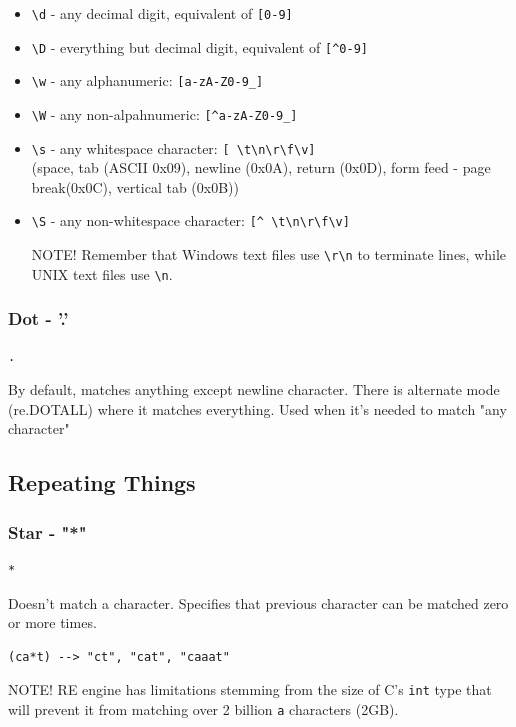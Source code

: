 \documentclass{beamer}
\begin{document}
\begin{frame}[fragile]
\begin{itemize}
\item \verb/\d/ - any decimal digit, equivalent of \verb/[0-9]/
\item \verb/\D/ - everything but decimal digit, equivalent of \verb/[^0-9]/
\pause
\item \verb/\w/ - any alphanumeric: \verb/[a-zA-Z0-9_]/
\item \verb/\W/ - any non-alpahnumeric: \verb/[^a-zA-Z0-9_]/
\pause
\item \verb/\s/ - any whitespace character: \verb/[ \t\n\r\f\v]/ \\ (space, tab (ASCII 0x09), newline (0x0A), return (0x0D), form feed - page break(0x0C), vertical tab (0x0B))
\item \verb/\S/ - any non-whitespace character: \verb/[^ \t\n\r\f\v]/

NOTE! Remember that Windows text files use \verb/\r\n/ to terminate lines, while UNIX text files use \verb/\n/.
\end{itemize}
\end{frame}

\subsubsection{Dot - '.'}
\begin{frame}
\begin{verbatim}
.
\end{verbatim}
By default, matches anything except newline character.
There is alternate mode (re.DOTALL) where it matches everything. Used when it's needed to match "any character"
\end{frame}

\subsection{Repeating Things}
\subsubsection{Star - "*"}
\begin{verbatim}
*
\end{verbatim}
\begin{frame}
Doesn't match a character. Specifies that previous character can be matched zero or more times.
\begin{verbatim}
(ca*t) --> "ct", "cat", "caaat"
\end{verbatim}
NOTE! RE engine has limitations stemming from the size of C's \verb/int/ type that will prevent it from matching over 2 billion \verb/a/ characters (2GB).
\end{frame}
\end{document}
